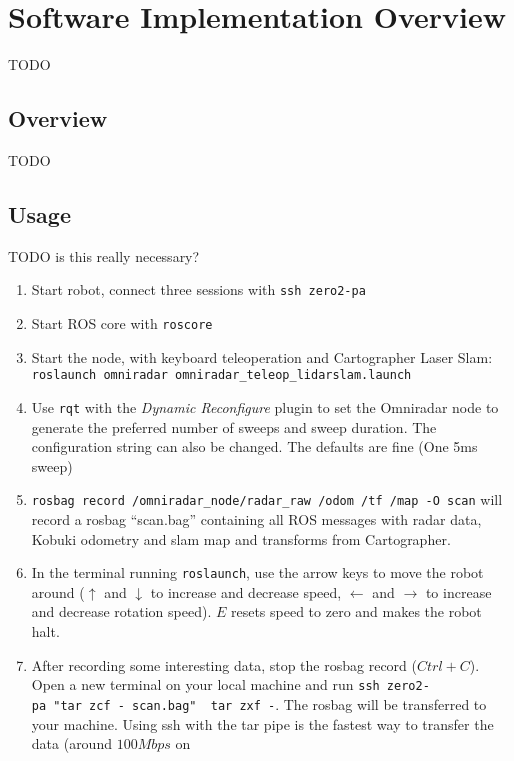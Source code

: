 \section{Software Implementation Overview}\label{overview}

TODO

\subsection{Overview}
TODO

\subsection{Usage}\label{usage}

TODO is this really necessary?

\begin{enumerate}
\def\labelenumi{\arabic{enumi}.}
\tightlist
\item
  Start robot, connect three sessions with \texttt{ssh\ zero2-pa}
\item
  Start ROS core with \texttt{roscore}
\item
  Start the node, with keyboard teleoperation and Cartographer Laser
  Slam:
  \texttt{roslaunch\ omniradar\ omniradar\_teleop\_lidarslam.launch}
\item
  Use \texttt{rqt} with the \emph{Dynamic Reconfigure} plugin to set the
  Omniradar node to generate the preferred number of sweeps and sweep
  duration. The configuration string can also be changed. The defaults
  are fine (One 5ms sweep)
\item
  \texttt{rosbag\ record\ /omniradar\_node/radar\_raw\ /odom\ /tf\ /map\ -O\ scan}
  will record a rosbag ``scan.bag'' containing all ROS messages with
  radar data, Kobuki odometry and slam map and transforms from
  Cartographer.
\item
  In the terminal running \texttt{roslaunch}, use the arrow keys to move
  the robot around (\(\uparrow\) and \(\downarrow\) to increase and
  decrease speed, \(\leftarrow\) and \(\rightarrow\) to increase and
  decrease rotation speed). \(E\) resets speed to zero and makes the
  robot halt.
\item
  After recording some interesting data, stop the rosbag record
  (\(Ctrl+C\)). Open a new terminal on your local machine and run
  \texttt{ssh\ zero2-pa\ "tar\ zcf\ -\ scan.bag"\ \textbar{}\ tar\ zxf\ -}.
  The rosbag will be transferred to your machine. Using ssh with the tar
  pipe is the fastest way to transfer the data (around \(100 Mbps\) on

\end{enumerate}
